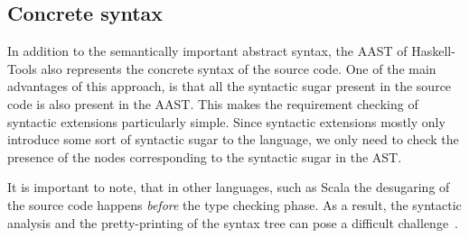 \documentclass[main.tex]{subfiles}
\begin{document}
	\subsection{Concrete syntax}
	
		In addition to the semantically important abstract syntax, the AAST of Haskell-Tools also represents the concrete syntax of the source code. One of the main advantages of this approach, is that all the syntactic sugar present in the source code is also present in the AAST. This makes the requirement checking of syntactic extensions particularly simple. Since syntactic extensions mostly only introduce some sort of syntactic sugar to the language, we only need to check the presence of the nodes corresponding to the syntactic sugar in the AST.
		
		It is important to note, that in other languages, such as Scala the desugaring of the source code happens \emph{before} the type checking phase. As a result, the syntactic analysis and the pretty-printing of the syntax tree can pose a difficult challenge~\cite{resugaring-scala}.
	
	
\end{document}
